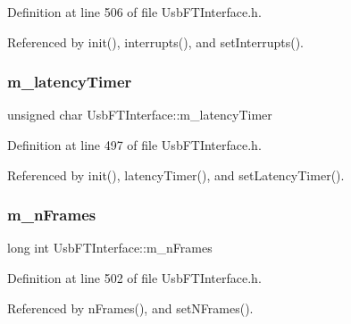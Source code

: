 Definition at line 506 of file Usb\+F\+T\+Interface.\+h.



Referenced by init(), interrupts(), and set\+Interrupts().

\mbox{\label{classUsbFTInterface_a0eefe6f2cee132da70176562cd126718}} 
\subsubsection{\texorpdfstring{m\+\_\+latency\+Timer}{m\_latencyTimer}}
{\footnotesize\ttfamily unsigned char Usb\+F\+T\+Interface\+::m\+\_\+latency\+Timer\hspace{0.3cm}{\ttfamily [private]}}



Definition at line 497 of file Usb\+F\+T\+Interface.\+h.



Referenced by init(), latency\+Timer(), and set\+Latency\+Timer().

\mbox{\label{classUsbFTInterface_a40770504afc4173034c8a8d6c5f5962c}} 
\subsubsection{\texorpdfstring{m\+\_\+n\+Frames}{m\_nFrames}}
{\footnotesize\ttfamily long int Usb\+F\+T\+Interface\+::m\+\_\+n\+Frames\hspace{0.3cm}{\ttfamily [private]}}



Definition at line 502 of file Usb\+F\+T\+Interface.\+h.



Referenced by n\+Frames(), and set\+N\+Frames().

\mbox{\label{classUsbFTInterface_aa4d5f5ffb4d3b26f1effdf84087aea91}} 
